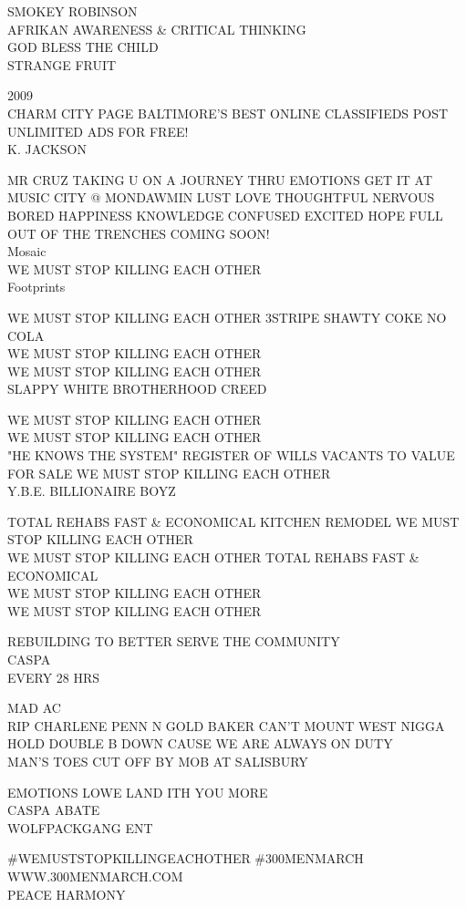 \documentclass[10pt,letterpaper]{article}
\begin{document}
SMOKEY ROBINSON\\
AFRIKAN AWARENESS \& CRITICAL THINKING\\
GOD BLESS THE CHILD\\
STRANGE FRUIT

2009\\
CHARM CITY PAGE BALTIMORE'S BEST ONLINE CLASSIFIEDS POST UNLIMITED ADS FOR FREE!\\
K. JACKSON

MR CRUZ TAKING U ON A JOURNEY THRU EMOTIONS GET IT AT MUSIC CITY @ MONDAWMIN LUST LOVE THOUGHTFUL NERVOUS BORED HAPPINESS KNOWLEDGE CONFUSED EXCITED HOPE FULL OUT OF THE TRENCHES COMING SOON!\\
Mosaic\\
WE MUST STOP KILLING EACH OTHER\\
Footprints

WE MUST STOP KILLING EACH OTHER 3STRIPE SHAWTY COKE NO COLA\\
WE MUST STOP KILLING EACH OTHER\\
WE MUST STOP KILLING EACH OTHER\\
SLAPPY WHITE BROTHERHOOD CREED

WE MUST STOP KILLING EACH OTHER\\
WE MUST STOP KILLING EACH OTHER\\
"HE KNOWS THE SYSTEM" REGISTER OF WILLS VACANTS TO VALUE FOR SALE WE MUST STOP KILLING EACH OTHER\\
Y.B.E. BILLIONAIRE BOYZ

TOTAL REHABS FAST \& ECONOMICAL KITCHEN REMODEL WE MUST STOP KILLING EACH OTHER\\
WE MUST STOP KILLING EACH OTHER TOTAL REHABS FAST \& ECONOMICAL\\
WE MUST STOP KILLING EACH OTHER\\
WE MUST STOP KILLING EACH OTHER

REBUILDING TO BETTER SERVE THE COMMUNITY\\
CASPA\\
EVERY 28 HRS

MAD AC\\
RIP CHARLENE PENN N GOLD BAKER CAN'T MOUNT WEST NIGGA HOLD DOUBLE B DOWN CAUSE WE ARE ALWAYS ON DUTY\\
MAN'S TOES CUT OFF BY MOB AT SALISBURY

EMOTIONS LOWE LAND ITH YOU MORE\\
CASPA ABATE\\
WOLFPACKGANG ENT

\#WEMUSTSTOPKILLINGEACHOTHER \#300MENMARCH WWW.300MENMARCH.COM\\
PEACE HARMONY
\end{document}
